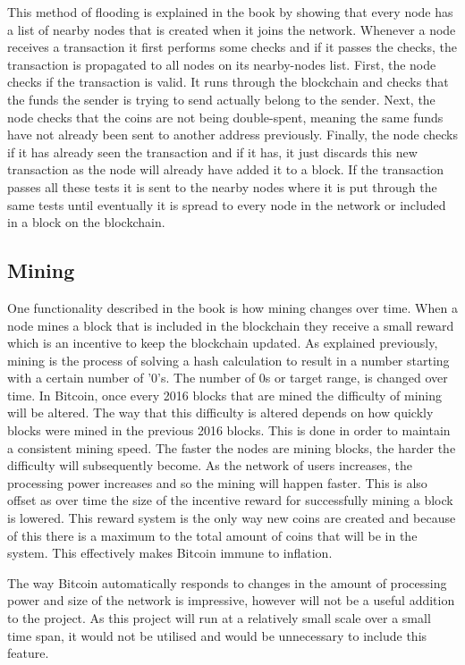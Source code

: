 \documentclass{l4proj}
\begin{document}
This method of flooding is explained in the book by showing that every node has a list of nearby nodes that is created
when it joins the network. Whenever a node receives a transaction it first performs some checks and if it passes the 
checks, the transaction is propagated to all nodes on its nearby-nodes list. First, the node checks if the transaction is
valid. It runs through the blockchain and checks that the funds the sender is trying to send actually belong to the sender.
Next, the node checks that the coins are not being double-spent, meaning the same funds have not already been sent to another
address previously. Finally, the node checks if it has already seen the transaction and if it has, it just discards this new
transaction as the node will already have added it to a block. If the transaction passes all these tests it is sent to the
nearby nodes where it is put through the same tests until eventually it is spread to every node in the network or included
in a block on the blockchain.

\subsection{Mining}
One functionality described in the book is how mining changes over time. When a node mines a block that is included in the
blockchain they receive a small reward which is an incentive to keep the blockchain updated. As explained previously,
mining is the process of solving a hash calculation to result in a number starting with a certain number of '0's. The number
of 0s or target range, is changed over time. In Bitcoin, once every 2016 blocks that are mined the difficulty of mining will be
altered. The way that this difficulty is altered depends on how quickly blocks were mined in the previous 2016 blocks. This
is done in order to maintain a consistent mining speed. The faster the nodes are mining blocks, the harder the difficulty
will subsequently become. As the network of users increases, the processing power increases and so the mining will happen
faster. This is also offset as over time the size of the incentive reward for successfully mining a block is lowered.
This reward system is the only way new coins are created and because of this there is a maximum to the total amount of coins
that will be in the system. This effectively makes Bitcoin immune to inflation.

The way Bitcoin automatically responds to changes in the amount of processing power and size of the network is impressive,
however will not be a useful addition to the project. As this project will run at a relatively small scale over a small
time span, it would not be utilised and would be unnecessary to include this feature.
\end{document}
